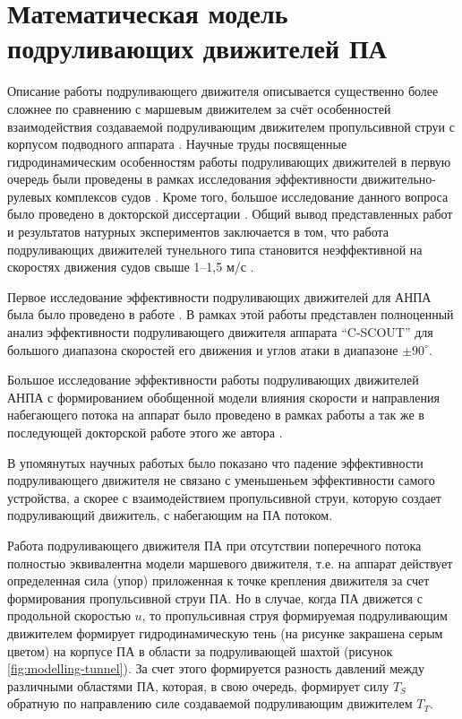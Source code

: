 \section{Математическая модель подруливающих движителей ПА}
Описание работы подруливающего движителя описывается существенно более сложнее по сравнению с маршевым движителем за счёт особенностей взаимодействия создаваемой подруливающим движителем пропульсивной струи с корпусом подводного аппарата \cite{tolstonogov2017auv}.
Научные труды посвященные гидродинамическим особенностям работы подруливающих движителей в первую очередь были проведены в рамках исследования эффективности движительно-рулевых комплексов судов \cite{chislett1966influence, english1964design, brix1973lateral}.
Кроме того, большое исследование данного вопроса было проведено в докторской диссертации \cite{nienhuis1992analysis}.
Общий вывод представленных работ и результатов натурных экспериментов заключается в том, что работа подруливающих движителей тунельного типа становится неэффективной на скоростях движения судов свыше 1–1,5 м/с \cite{english63}.

Первое исследование эффективности подруливающих движителей для АНПА была было проведено в работе \cite{saunders2002effect}. 
В рамках этой работы представлен полноценный анализ эффективности подруливающего движителя аппарата ``C-SCOUT'' для большого диапазона скоростей его движения и углов атаки в диапазоне $\pm90^{\circ}$.

Большое исследование эффективности работы подруливающих движителей АНПА с формированием обобщенной модели влияния скорости и направления набегающего потока на аппарат было проведено в рамках работы \cite{palmer2008modelling} а так же в последующей докторской работе этого же автора \cite{palmer2009analysis}.

В упомянутых научных работых было показано что падение эффективности подруливающего движителя не связано с уменьшеньем эффективности самого устройства, а скорее с взаимодействием пропульсивной струи, которую создает подруливающий движитель, с набегающим на ПА потоком.

Работа подруливающего движителя ПА при отсутствии поперечного потока полностью эквивалентна модели маршевого движителя, т.е. на аппарат действует определенная сила (упор) приложенная к точке крепления движителя за счет формирования пропульсивной струи ПА.
Но в случае, когда ПА движется с продольной скоростью $u$, то пропульсивная струя формируемая подруливающим движителем формирует гидродинамическую тень (на рисунке закрашена серым цветом) на корпусе ПА в области за подруливающей шахтой (рисунок \ref{fig:modelling-tunnel}).
За счет этого формируется разность давлений между различными областями ПА, которая, в свою очередь, формирует силу $T_S$ обратную по направлению силе создаваемой подруливающим движителем $T_T$.

